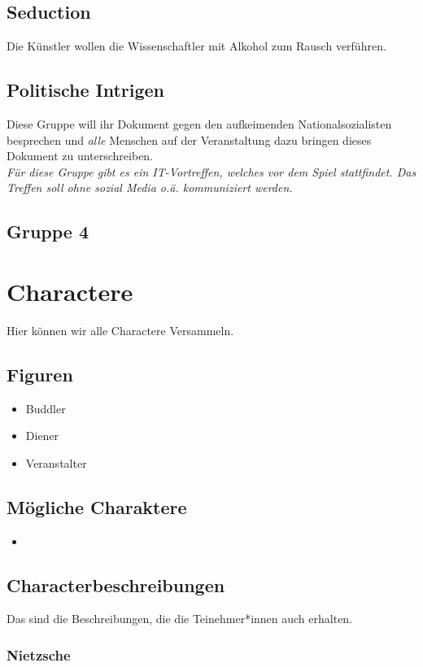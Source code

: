 \documentclass[12pt, a4paper, openany]{report}
\begin{document}
\section{Seduction}
Die Künstler wollen die Wissenschaftler mit Alkohol zum Rausch verführen.

\section{Politische Intrigen}
Diese Gruppe will ihr Dokument gegen den aufkeimenden Nationalsozialisten besprechen und \emph{alle} Menschen auf der Veranstaltung dazu bringen dieses Dokument zu unterschreiben.\\

\emph{Für diese Gruppe gibt es ein IT-Vortreffen, welches vor dem Spiel stattfindet.
Das Treffen soll ohne sozial Media o.ä. kommuniziert werden.}

\section{Gruppe 4}

\chapter{Charactere}
Hier können wir alle Charactere Versammeln.

\section{Figuren}
\begin{itemize}
    \item Buddler
    \item Diener
    \item Veranstalter
\end{itemize}

\section{Mögliche Charaktere}
\begin{itemize}
    \item 
\end{itemize}
\section{Characterbeschreibungen}
Das sind die Beschreibungen, die die Teinehmer*innen auch erhalten.

\subsection{Nietzsche}
\end{document}
